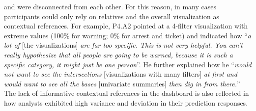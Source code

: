 and were disconnected from each other.
For this reason, in many cases\change{,}
participants could only rely on relatives
and the overall visualization as contextual references.
For example, P4.A2 pointed at a 4-filter visualization
with extreme values (100\% for warning; 0\% for arrest and ticket)
and indicated how ``\textit{a lot of} [the visualizations]
\textit{are far too specific. This is not very helpful.
You can't really hypothesize that all people are} \change{[sic]}
\textit{going to be warned, because it is such a specific category,
it might just be one person}''. %
He further explained how he ``\textit{would not want to see the intersections} [visualizations with many filters] \textit{at first and would want to see all the bases} [univariate summaries] \textit{then dig in from there.}'' The lack of informative contextual references in the \cluster dashboard is also reflected in how analysts exhibited high variance and deviation in their prediction responses. %


